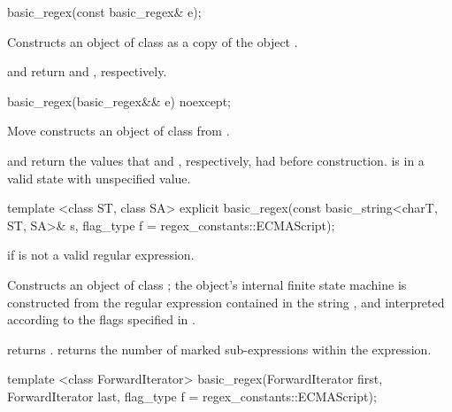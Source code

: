 %
\begin{itemdecl}
basic_regex(const basic_regex& e);
\end{itemdecl}

\begin{itemdescr}
\pnum
\effects  Constructs an object of class  as a copy of
the object .

\pnum\postconditions
{} and  return
 and , respectively.
\end{itemdescr}

%
\begin{itemdecl}
basic_regex(basic_regex&& e) noexcept;
\end{itemdecl}

\begin{itemdescr}
\pnum
\effects  Move constructs an object of class  from .

\pnum
\postconditions {} and  return the values that
 and , respectively, had before construction.
 is in a valid state with unspecified value.
\end{itemdescr}

%
\begin{itemdecl}
template <class ST, class SA>
  explicit basic_regex(const basic_string<charT, ST, SA>& s,
                       flag_type f = regex_constants::ECMAScript);
\end{itemdecl}

\begin{itemdescr}
\pnum
\throws  {} if  is not a valid regular expression.

\pnum
\effects  Constructs an object of class ; the object's
internal finite state machine is constructed from the regular
expression contained in the string , and interpreted according to the
flags specified in .

\pnum\postconditions
{} returns . 
 returns the number of marked sub-expressions
within the expression.
\end{itemdescr}

%
\begin{itemdecl}
template <class ForwardIterator>
  basic_regex(ForwardIterator first, ForwardIterator last,
              flag_type f = regex_constants::ECMAScript);
\end{itemdecl}

